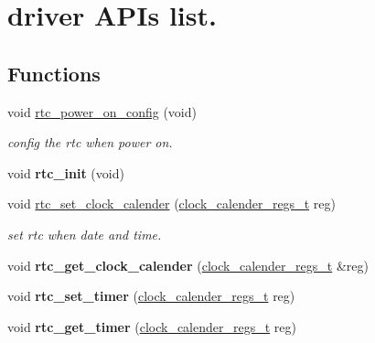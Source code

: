 \hypertarget{group___r_t_c}{}\section{driver A\+P\+Is list.}
\label{group___r_t_c}
\subsection*{Functions}
\begin{DoxyCompactItemize}
\item 
void \hyperlink{group___r_t_c_gadfdd04b6463b9cbaa7d0953cbee7ee44}{rtc\+\_\+power\+\_\+on\+\_\+config} (void)
\begin{DoxyCompactList}\small\item\em config the rtc when power on. \end{DoxyCompactList}\item 
\mbox{\label{group___r_t_c_gacf9024748b942a7ae375cf75951afa9c}} 
void {\bfseries rtc\+\_\+init} (void)
\item 
void \hyperlink{group___r_t_c_gaa3c47a6523ac3f2f446ff6e99ab92c5e}{rtc\+\_\+set\+\_\+clock\+\_\+calender} (\hyperlink{struct__clock__calender__regs__t__}{clock\+\_\+calender\+\_\+regs\+\_\+t} reg)
\begin{DoxyCompactList}\small\item\em set rtc when date and time. \end{DoxyCompactList}\item 
\mbox{\label{group___r_t_c_ga087ecd3ca7c8458648f0bed27102a5f2}} 
void {\bfseries rtc\+\_\+get\+\_\+clock\+\_\+calender} (\hyperlink{struct__clock__calender__regs__t__}{clock\+\_\+calender\+\_\+regs\+\_\+t} \&reg)
\item 
\mbox{\label{group___r_t_c_ga93fc9a50387382e7ca910d359691df9b}} 
void {\bfseries rtc\+\_\+set\+\_\+timer} (\hyperlink{struct__clock__calender__regs__t__}{clock\+\_\+calender\+\_\+regs\+\_\+t} reg)
\item 
\mbox{\label{group___r_t_c_ga4159824f892cdb786db14db0adea3250}} 
void {\bfseries rtc\+\_\+get\+\_\+timer} (\hyperlink{struct__clock__calender__regs__t__}{clock\+\_\+calender\+\_\+regs\+\_\+t} reg)
\item 
\mbox{\label{group___r_t_c_ga964a279f60734692cd60d788319cb613}} 

\end{DoxyCompactItemize}
